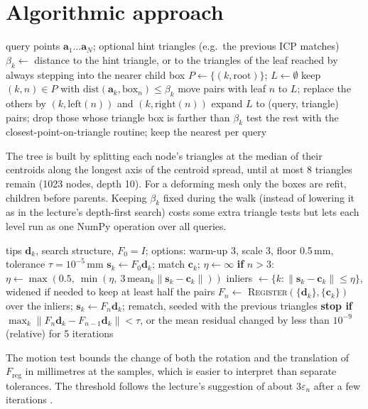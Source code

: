 \documentclass[10pt]{article}
\newcommand{\vect}[1]{\mathbf{#1}}
\newcommand{\F}{F_{\mathrm{reg}}}
\begin{document}
\section{Algorithmic approach}

\begin{algorithm}[H]
\caption{Batched bounding-box tree search (\texttt{BoundingBoxTree.closest\_points})}
\begin{algorithmic}[1]
\Require query points $\vect a_1\dots\vect a_N$; optional hint triangles (e.g.\ the previous ICP matches)
\State $\beta_k\gets$ distance to the hint triangle, or to the triangles of the leaf reached by always stepping into the nearer child box
\State $P\gets\{(k,\text{root})\}$; $L\gets\emptyset$
 
  \State keep $(k,n)\in P$ with $\mathrm{dist}(\vect a_k,\mathrm{box}_n)\le\beta_k$
  \State move pairs with leaf $n$ to $L$; replace the others by $(k,\mathrm{left}(n))$ and $(k,\mathrm{right}(n))$
\EndWhile
\State expand $L$ to (query, triangle) pairs; drop those whose triangle box is farther than $\beta_k$
\State test the rest with the closest-point-on-triangle routine; keep the nearest per query
\end{algorithmic}
\end{algorithm}
The tree is built by splitting each node's triangles at the median of their centroids along the longest axis of the centroid spread, until at most 8 triangles remain (1023 nodes, depth 10). For a deforming mesh only the boxes are refit, children before parents. Keeping $\beta_k$ fixed during the walk (instead of lowering it as in the lecture's depth-first search) costs some extra triangle tests but lets each level run as one NumPy operation over all queries.

\begin{algorithm}[H]
\caption{Rigid ICP (\texttt{icp.icp})}
\begin{algorithmic}[1]
\Require tips $\vect d_k$, search structure, $F_0=I$; options: warm-up 3, scale 3, floor 0.5\,mm, tolerance $\tau=10^{-5}$\,mm
\State $\vect s_k\gets F_0\vect d_k$; match $\vect c_k$; $\eta\gets\infty$
  \State \textbf{if} $n>3$: $\eta\gets\max(0.5,\ \min(\eta,\ 3\,\mathrm{mean}_k\|\vect s_k-\vect c_k\|))$ 
  \State inliers $\gets\{k:\|\vect s_k-\vect c_k\|\le\eta\}$, widened if needed to keep at least half the pairs
  \State $F_n\gets$ \textsc{Register}$(\{\vect d_k\},\{\vect c_k\})$ over the inliers; $\vect s_k\gets F_n\vect d_k$; rematch, seeded with the previous triangles
  \State \textbf{stop if} $\max_k\|F_n\vect d_k-F_{n-1}\vect d_k\|<\tau$, or the mean residual changed by less than $10^{-9}$ (relative) for 5 iterations
\EndFor
\end{algorithmic}
\end{algorithm}
The motion test bounds the change of both the rotation and the translation of $\F$ in millimetres at the samples, which is easier to interpret than separate tolerances. The threshold follows the lecture's suggestion of about $3\varepsilon_n$ after a few iterations \cite{lecreg1}.
\end{document}
